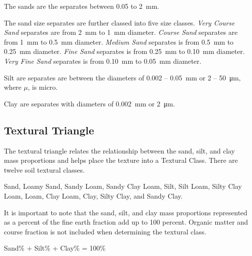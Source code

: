 \documentclass[a5paper]{book}
\begin{document}
The sands are the separates between \SI{0.05}{} to \SI{2}{\milli\metre}.

The sand size separates are further classed into five size classes. \emph{Very Course Sand} separates are from \SI{2}{\milli\metre} to \SI{1}{\milli\metre} diameter. \emph{Course Sand} separates are from \SI{1}{\milli\metre} to \SI{0.5}{\milli\metre} diameter. \emph{Medium Sand} separates is from \SI{0.5}{\milli\metre} to \SI{0.25}{\milli\metre} diameter. \emph{Fine Sand} separates is from \SI{0.25}{\milli\metre} to \SI{0.10}{\milli\metre} diameter. \emph{Very Fine Sand} separates is from \SI{0.10}{\milli\metre} to \SI{0.05}{\milli\metre} diameter.
    
Silt are separates are between the diameters of \SI{0.002}{} – \SI{0.05}{\milli\metre} or \SI{2}{} – \SI{50}{\micro\metre}, where $\mu$, is micro.

Clay are separates with diameters of \SI{0.002}{\milli\metre} or \SI{2}{\micro\metre}.

\subsection{Textural Triangle}
    
The textural triangle relates the relationship between the sand, silt, and clay mass proportions and helps place the texture into a Textural Class. There are twelve soil textural classes.
    
Sand, Loamy Sand, Sandy Loam, Sandy Clay Loam, Silt, Silt Loam, Silty Clay Loam, Loam, Clay Loam, Clay, Silty Clay, and Sandy Clay.
    
It is important to note that the sand, silt, and clay mass proportions represented as a percent of the fine earth fraction add up to 100 percent. Organic matter and course fraction is not included when determining the textural class.
    
\begin{center}
Sand\% + Silt\% + Clay\% = 100\%
\end{center}
    
\end{document}
